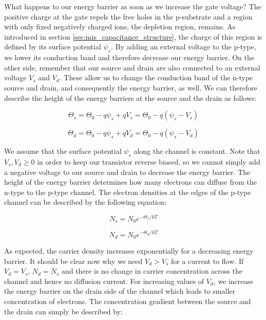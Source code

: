 What happens to our energy barrier as soon as we increase the gate voltage? The positive charge at the gate repels the free holes in the p-substrate and a region with only fixed negatively charged ions, the depletion region, remains. As introduced in section \ref{sec:mis_capacitance_structure}, the charge of this region is defined by its surface potential $\psi_s$. By adding an external voltage to the p-type, we lower its conduction band and therefore decrease our energy barrier. On the other side, remember that our source and drain are also connected to an external voltage $V_s$ and $V_d$. These allow us to change the conduction band of the n-type source and drain, and consequently the energy barrier, as well. We can therefore describe the height of the energy barriers at the source and the drain as follows:

\begin{equation}
    \Theta_s = \Theta_0 - q \psi_s + q V_s = \Theta_0 - q (\psi_s - V_s)
\end{equation}

\begin{equation}
    \Theta_d = \Theta_0 - q \psi_s + q V_d = \Theta_0 - q (\psi_s - V_d)
\end{equation}

We assume that the surface potential $\psi_s$ along the channel is constant. Note that $V_s, V_d \ge 0$ in order to keep our transistor reverse biased, so we cannot simply add a negative voltage to our source and drain to decrease the energy barrier. The height of the energy barrier determines how many electrons can diffuse from the n-type to the p-type channel. The electron densities at the edges of the p-type channel can be described by the following equation:

\begin{equation}
    N_s = N_0 e^{-\Theta_s/kT}
\end{equation}

\begin{equation}
    N_d = N_0 e^{-\Theta_d/kT}
\end{equation}

As expected, the carrier density increases exponentially for a decreasing energy barrier. It should be clear now why we need $V_d > V_s$ for a current to flow. If $V_d = V_s$, $N_d = N_s$ and there is no change in carrier concentration across the channel and hence no diffusion current. For increasing values of $V_d$, we increase the energy barrier on the drain side of the channel which leads to smaller concentration of electrons. The concentration gradient between the source and the drain can simply be described by:

